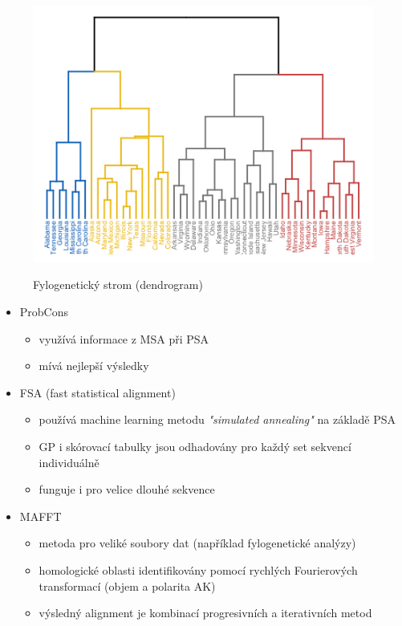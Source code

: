 \documentclass[DIV=8]{scrreprt}
\begin{document}
\begin{figure}[p]
    \caption{Fylogenetický strom (dendrogram)}
    \includegraphics[width=\tex pdftwidth]{dendrogram.png}
    \centering
    \label{}
\end{figure}


\begin{itemize}
    \item ProbCons
\begin{itemize}
    \item využívá informace z MSA při PSA
    \item mívá nejlepší výsledky
\end{itemize}

    \item FSA (fast statistical alignment)
\begin{itemize}
    \item používá machine learning metodu \emph{"simulated annealing"} na základě PSA
    \item GP i skórovací tabulky jsou odhadovány pro každý set sekvencí individuálně
    \item funguje i pro velice dlouhé sekvence
\end{itemize}

    \item MAFFT
\begin{itemize}
    \item metoda pro veliké soubory dat (například fylogenetické analýzy)
    \item homologické oblasti identifikovány pomocí rychlých Fourierových transformací (objem a polarita AK)
    \item výsledný alignment je kombinací progresivních a iterativních metod
\end{itemize}

\end{itemize}
\end{document}
